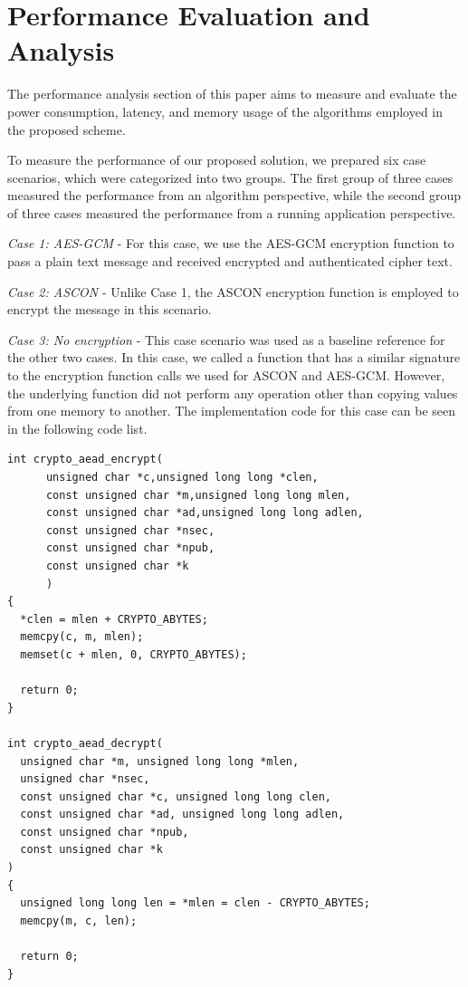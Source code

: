 \section{Performance Evaluation and Analysis}


The performance analysis section of this paper aims to measure and evaluate the power consumption, latency, and memory usage of the algorithms employed in the proposed scheme.

To measure the performance of our proposed solution, we prepared six case scenarios, which were categorized into two groups. The first group of three cases measured the performance from an algorithm perspective, while the second group of three cases measured the performance from a running application perspective.


\textit{Case 1: AES-GCM} - For this case, we use the AES-GCM encryption function to pass a plain text message and received encrypted and authenticated cipher text. 

\textit{Case 2: ASCON} - 
Unlike Case 1, the ASCON encryption function is employed to encrypt the message in this scenario.

\textit{Case 3: No encryption} - This case scenario was used as a baseline reference for the other two cases. In this case, we called a function that has a similar signature to the encryption function calls we used for ASCON and AES-GCM. However, the underlying function did not perform any operation other than copying values from one memory to another. The implementation code for this case can be seen in the following code list.

\begin{lstlisting}[style=CStyle]
int crypto_aead_encrypt(
      unsigned char *c,unsigned long long *clen,
      const unsigned char *m,unsigned long long mlen,
      const unsigned char *ad,unsigned long long adlen,
      const unsigned char *nsec,
      const unsigned char *npub,
      const unsigned char *k
      )
{
  *clen = mlen + CRYPTO_ABYTES;
  memcpy(c, m, mlen);
  memset(c + mlen, 0, CRYPTO_ABYTES);

  return 0;
}

int crypto_aead_decrypt(
  unsigned char *m, unsigned long long *mlen,
  unsigned char *nsec,
  const unsigned char *c, unsigned long long clen,
  const unsigned char *ad, unsigned long long adlen,
  const unsigned char *npub,
  const unsigned char *k
)
{
  unsigned long long len = *mlen = clen - CRYPTO_ABYTES;
  memcpy(m, c, len);

  return 0;
} 
\end{lstlisting}


